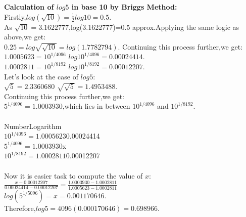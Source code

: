 \documentclass[a4paper,reqno,11pt]{book}
\theoremstyle{plain}%
\theoremstyle{definition}
\begin{document}
\noindent\textbf{Calculation of $log5$ in base 10 by Briggs Method:}\\
\noindent Firstly,$log(\sqrt{10})=\frac{1}{2}log10=0.5$.\\
As $\sqrt{10}=3.1622777$,log(3.1622777)=0.5 approx.Applying the same logic as above,we get:\\
$0.25=log\sqrt{\sqrt{10}}=log(1.7782794).$
Continuing this process further,we get:
$1.0005623=10^{1/4096}$ \hspace{2cm} $log10^{1/4096}=0.00024414$.\\
$1.0002811=10^{1/8192}$ \hspace{2cm} $log10^{1/8192}=0.00012207$.\\
Let's look at the case of $log5$:\\
$\sqrt{5}=2.3360680$ \hspace{3cm} $\sqrt{\sqrt{5}}=1.4953488$.\\
Continuing this process further,we get:\\
$5^{1/4096}=1.0003930$,which lies in between $10^{1/4096}$ and $10^{1/8192}$.\\
\\
Number\hspace{3cm}Logarithm\\
$10^{1/4096}=1.0005623$\hspace{1cm}0.00024414\\
$5^{1/4096}=1.0003930$\hspace{1.5cm}x\\
$10^{1/8192}=1.0002811$\hspace{1cm}0.00012207\\
\\
Now it is easier task to compute the value of $x$:\\

$\frac{x-0.00012207}{0.00024414-0.00012207}=\frac{1.0003930-1.0002811}{1.0005623-1.0002811}$\\

\noindent$log(5^{1/5096})=x=0.001170646.$\\
Therefore,$log5=4096(0.000170646)=0.698966.$\\
\end{document}
